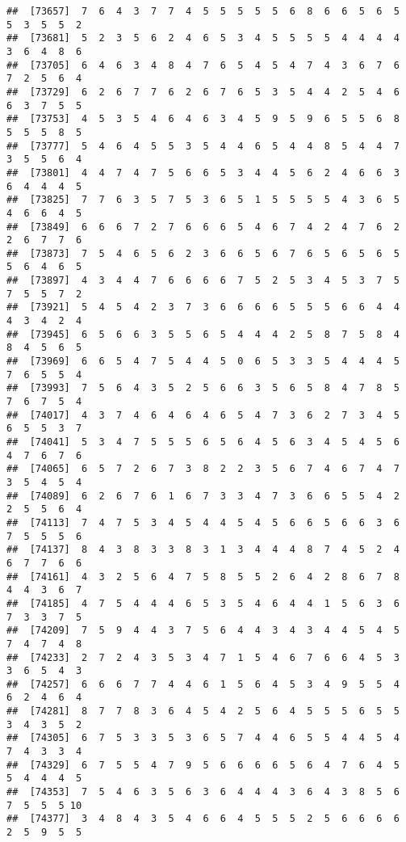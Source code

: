 \documentclass[
]{book}
\begin{document}
\begin{verbatim}
##  [73657]  7  6  4  3  7  7  4  5  5  5  5  5  6  8  6  6  5  6  5  5  3  5  5  2
##  [73681]  5  2  3  5  6  2  4  6  5  3  4  5  5  5  5  4  4  4  4  3  6  4  8  6
##  [73705]  6  4  6  3  4  8  4  7  6  5  4  5  4  7  4  3  6  7  6  7  2  5  6  4
##  [73729]  6  2  6  7  7  6  2  6  7  6  5  3  5  4  4  2  5  4  6  6  3  7  5  5
##  [73753]  4  5  3  5  4  6  4  6  3  4  5  9  5  9  6  5  5  6  8  5  5  5  8  5
##  [73777]  5  4  6  4  5  5  3  5  4  4  6  5  4  4  8  5  4  4  7  3  5  5  6  4
##  [73801]  4  4  7  4  7  5  6  6  5  3  4  4  5  6  2  4  6  6  3  6  4  4  4  5
##  [73825]  7  7  6  3  5  7  5  3  6  5  1  5  5  5  5  4  3  6  5  4  6  6  4  5
##  [73849]  6  6  6  7  2  7  6  6  6  5  4  6  7  4  2  4  7  6  2  2  6  7  7  6
##  [73873]  7  5  4  6  5  6  2  3  6  6  5  6  7  6  5  6  5  6  5  5  6  4  6  5
##  [73897]  4  3  4  4  7  6  6  6  6  7  5  2  5  3  4  5  3  7  5  7  5  5  7  2
##  [73921]  5  4  5  4  2  3  7  3  6  6  6  6  5  5  5  6  6  4  4  4  3  4  2  4
##  [73945]  6  5  6  6  3  5  5  6  5  4  4  4  2  5  8  7  5  8  4  8  4  5  6  5
##  [73969]  6  6  5  4  7  5  4  4  5  0  6  5  3  3  5  4  4  4  5  7  6  5  5  4
##  [73993]  7  5  6  4  3  5  2  5  6  6  3  5  6  5  8  4  7  8  5  7  6  7  5  4
##  [74017]  4  3  7  4  6  4  6  4  6  5  4  7  3  6  2  7  3  4  5  6  5  5  3  7
##  [74041]  5  3  4  7  5  5  5  6  5  6  4  5  6  3  4  5  4  5  6  4  7  6  7  6
##  [74065]  6  5  7  2  6  7  3  8  2  2  3  5  6  7  4  6  7  4  7  3  5  4  5  4
##  [74089]  6  2  6  7  6  1  6  7  3  3  4  7  3  6  6  5  5  4  2  2  5  5  6  4
##  [74113]  7  4  7  5  3  4  5  4  4  5  4  5  6  6  5  6  6  3  6  7  5  5  5  6
##  [74137]  8  4  3  8  3  3  8  3  1  3  4  4  4  8  7  4  5  2  4  6  7  7  6  6
##  [74161]  4  3  2  5  6  4  7  5  8  5  5  2  6  4  2  8  6  7  8  4  4  3  6  7
##  [74185]  4  7  5  4  4  4  6  5  3  5  4  6  4  4  1  5  6  3  6  7  3  3  7  5
##  [74209]  7  5  9  4  4  3  7  5  6  4  4  3  4  3  4  4  5  4  5  7  4  7  4  8
##  [74233]  2  7  2  4  3  5  3  4  7  1  5  4  6  7  6  6  4  5  3  3  6  5  4  3
##  [74257]  6  6  6  7  7  4  4  6  1  5  6  4  5  3  4  9  5  5  4  6  2  4  6  4
##  [74281]  8  7  7  8  3  6  4  5  4  2  5  6  4  5  5  5  6  5  5  3  4  3  5  2
##  [74305]  6  7  5  3  3  5  3  6  5  7  4  4  6  5  5  4  4  5  4  7  4  3  3  4
##  [74329]  6  7  5  5  4  7  9  5  6  6  6  6  5  6  4  7  6  4  5  5  4  4  4  5
##  [74353]  7  5  4  6  3  5  6  3  6  4  4  4  3  6  4  3  8  5  6  7  5  5  5 10
##  [74377]  3  4  8  4  3  5  4  6  6  4  5  5  5  2  5  6  6  6  6  2  5  9  5  5

\end{verbatim}
\end{document}
